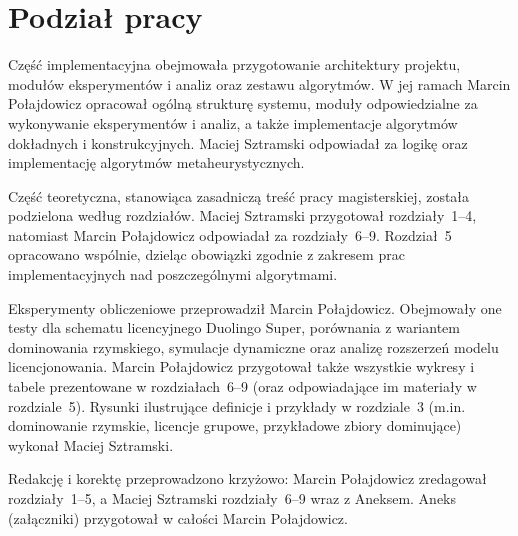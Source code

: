 \chapter*{Podział pracy}

Część implementacyjna obejmowała przygotowanie architektury projektu, modułów eksperymentów i analiz oraz zestawu algorytmów. W jej ramach Marcin Połajdowicz opracował ogólną strukturę systemu, moduły odpowiedzialne za wykonywanie eksperymentów i analiz, a także implementacje algorytmów dokładnych i konstrukcyjnych. Maciej Sztramski odpowiadał za logikę oraz implementację algorytmów metaheurystycznych.

Część teoretyczna, stanowiąca zasadniczą treść pracy magisterskiej, została podzielona według rozdziałów. Maciej Sztramski przygotował rozdziały~1--4, natomiast Marcin Połajdowicz odpowiadał za rozdziały~6--9. Rozdział~5 opracowano wspólnie, dzieląc obowiązki zgodnie z zakresem prac implementacyjnych nad poszczególnymi algorytmami.

Eksperymenty obliczeniowe przeprowadził Marcin Połajdowicz. Obejmowały one testy dla schematu licencyjnego Duolingo Super, porównania z wariantem dominowania rzymskiego, symulacje dynamiczne oraz analizę rozszerzeń modelu licencjonowania. Marcin Połajdowicz przygotował także wszystkie wykresy i tabele prezentowane w rozdziałach~6--9 (oraz odpowiadające im materiały w rozdziale~5). Rysunki ilustrujące definicje i przykłady w rozdziale~3 (m.in. dominowanie rzymskie, licencje grupowe, przykładowe zbiory dominujące) wykonał Maciej Sztramski.

Redakcję i korektę przeprowadzono krzyżowo: Marcin Połajdowicz zredagował rozdziały~1--5, a Maciej Sztramski rozdziały~6--9 wraz z Aneksem. Aneks (załączniki) przygotował w całości Marcin Połajdowicz.
